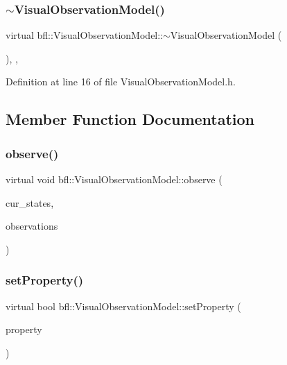 \subsubsection{\texorpdfstring{$\sim$\+Visual\+Observation\+Model()}{~VisualObservationModel()}}
{\footnotesize\ttfamily virtual bfl\+::\+Visual\+Observation\+Model\+::$\sim$\+Visual\+Observation\+Model (\begin{DoxyParamCaption}{ }\end{DoxyParamCaption})\hspace{0.3cm}{\ttfamily [inline]}, {\ttfamily [virtual]}, {\ttfamily [noexcept]}}



Definition at line 16 of file Visual\+Observation\+Model.\+h.



\subsection{Member Function Documentation}
\mbox{\label{classbfl_1_1VisualObservationModel_aa85438d953ae87839b8bd1064817cfa7}} 
\subsubsection{\texorpdfstring{observe()}{observe()}}
{\footnotesize\ttfamily virtual void bfl\+::\+Visual\+Observation\+Model\+::observe (\begin{DoxyParamCaption}\item[{const Eigen\+::\+Ref$<$ const Eigen\+::\+Matrix\+Xf $>$ \&}]{cur\+\_\+states,  }\item[{cv\+::\+Output\+Array}]{observations }\end{DoxyParamCaption})\hspace{0.3cm}{\ttfamily [pure virtual]}}

\mbox{\label{classbfl_1_1VisualObservationModel_a06a81257554785084b6cb9488e9d89c6}} 
\subsubsection{\texorpdfstring{set\+Property()}{setProperty()}}
{\footnotesize\ttfamily virtual bool bfl\+::\+Visual\+Observation\+Model\+::set\+Property (\begin{DoxyParamCaption}\item[{const std\+::string}]{property }\end{DoxyParamCaption})\hspace{0.3cm}{\ttfamily [pure virtual]}}



